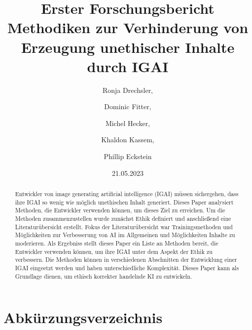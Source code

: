 \documentclass[12pt]{report}
\title{Erster Forschungsbericht \\[1ex] \large Methodiken zur Verhinderung von  Erzeugung unethischer Inhalte durch IGAI}
\date{21.05.2023}
\author{Ronja Drechsler, \and Dominic Fitter, \and Michel Hecker, \and Khaldon Kassem, \and Phillip Eckstein}
\begin{document}
\maketitle
\tableofcontents
\newpage

\section*{Abkürzungsverzeichnis}
\begin{acronym}[Abkürzungsverzeichnis]
	
\end{acronym}
\newpage

\begin{abstract}
	Entwickler von image generating artificial intelligence (IGAI) müssen sichergehen, dass ihre IGAI so wenig wie möglich unethischen Inhalt generiert.
	Dieses Paper analysiert Methoden, die Entwickler verwenden können, um dieses Ziel zu erreichen. 
	Um die Methoden zusammenzustellen wurde zunächst Ethik definiert und anschließend eine Literaturübersicht erstellt. 
	Fokus der Literaturübersicht war Trainingsmethoden und Möglichkeiten zur Verbesserung von AI im Allgemeinen und Möglichkeiten Inhalte zu moderieren. 
	Als Ergebniss stellt dieses Paper ein Liste an Methoden bereit, die Entwickler verwenden können, um ihre IGAI unter dem Aspekt der Ethik zu verbessern. 
	Die Methoden können in verschiedenen Abschnitten der Entwicklung einer IGAI eingeetzt werden und haben unterschiedliche Komplexität. 
	Dieses Paper kann als Grundlage dienen, um ethisch korrekter handelnde KI zu entwickeln.
\end{abstract}
\end{document}
